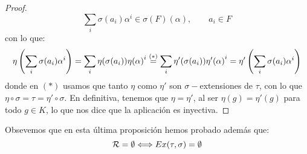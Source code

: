 \begin{prop}
\begin{proof}
        \begin{equation*}
            \sum_{i} \sigma(a_i) \alpha^i \in \sigma(F)(\alpha), \qquad a_i \in F
        \end{equation*}
        con lo que:
        \begin{equation*}
            \eta\left(\sum_{i}\sigma(a_i)\alpha^i\right) = \sum_i \eta(\sigma(a_i)) {\eta(\alpha)}^{i} \stackrel{(\ast)}{=} \sum_i \eta'(\sigma(a_i)) {\eta'(\alpha)}^{i} = \eta'\left(\sum_{i}\sigma(a_i)\alpha^i\right) 
        \end{equation*}
        donde en $(\ast)$ usamos que tanto $\eta$ como $\eta'$ son $\sigma-$extensiones de $\tau$, con lo que $\eta\circ \sigma = \tau = \eta'\circ \sigma$. En definitiva, tenemos que $\eta = \eta'$, al ser $\eta(g) = \eta'(g)$ para todo $g\in K$, lo que nos dice que la aplicación es inyectiva.
    \end{proof}
\end{prop}

\noindent
Obsevemos que en esta última proposición hemos probado además que:
\begin{equation*}
    \mathcal{R}= \emptyset  \Longleftrightarrow Ex(\tau,\sigma) =  \emptyset 
\end{equation*}

